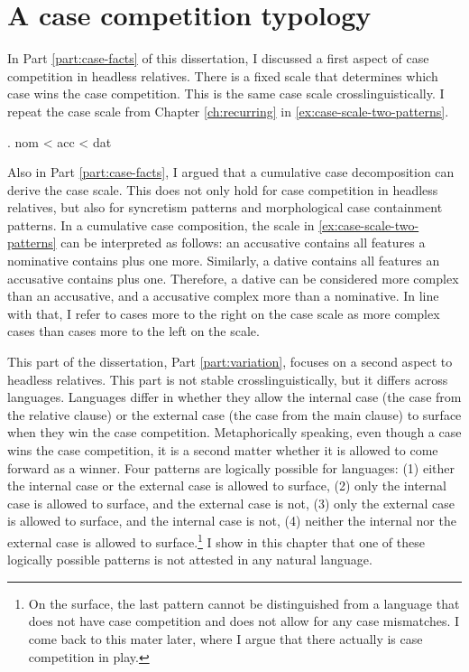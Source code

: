 
\chapter{A case competition typology}

In Part \ref{part:case-facts} of this dissertation, I discussed a first aspect of case competition in headless relatives. There is a fixed scale that determines which case wins the case competition. This is the same case scale crosslinguistically. I repeat the case scale from Chapter \ref{ch:recurring} in \ref{ex:case-scale-two-patterns}.

\ex. \ac{nom} < \ac{acc} < \ac{dat}\label{ex:case-scale-two-patterns}

Also in Part \ref{part:case-facts}, I argued that a cumulative case decomposition can derive the case scale. This does not only hold for case competition in headless relatives, but also for syncretism patterns and morphological case containment patterns. In a cumulative case composition, the scale in \ref{ex:case-scale-two-patterns} can be interpreted as follows: an accusative contains all features a nominative contains plus one more. Similarly, a dative contains all features an accusative contains plus one. Therefore, a dative can be considered more complex than an accusative, and a accusative complex more than a nominative. In line with that, I refer to cases more to the right on the case scale as more complex cases than cases more to the left on the scale.

This part of the dissertation, Part \ref{part:variation}, focuses on a second aspect to headless relatives. This part is not stable crosslinguistically, but it differs across languages. Languages differ in whether they allow the internal case (the case from the relative clause) or the external case (the case from the main clause) to surface when they win the case competition. Metaphorically speaking, even though a case wins the case competition, it is a second matter whether it is allowed to come forward as a winner. Four patterns are logically possible for languages: (1) either the internal case or the external case is allowed to surface, (2) only the internal case is allowed to surface, and the external case is not, (3) only the external case is allowed to surface, and the internal case is not, (4) neither the internal nor the external case is allowed to surface.\footnote{
On the surface, the last pattern cannot be distinguished from a language that does not have case competition and does not allow for any case mismatches. I come back to this mater later, where I argue that there actually is case competition in play.
}
I show in this chapter that one of these logically possible patterns is not attested in any natural language.

